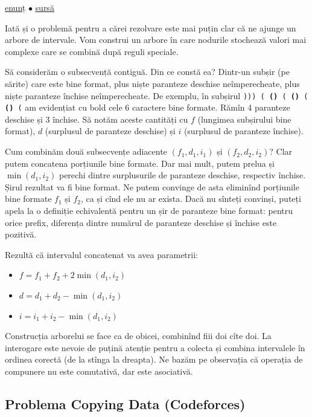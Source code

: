 \documentclass[../main.tex]{subfiles}
\begin{document}
\href{https://codeforces.com/contest/380/problem/C}{enunț}
$\bullet$
\hyperref[code:sereja-and-brackets]{sursă}

Iată și o problemă pentru a cărei rezolvare este mai puțin clar că ne ajunge un arbore de intervale. Vom construi un arbore în care nodurile stochează valori mai complexe care se combină după reguli speciale.

Să considerăm o subsecvență contiguă. Din ce constă ea? Dintr-un subșir (pe sărite) care este bine format, plus niște paranteze deschise neîmperecheate, plus niște paranteze închise neîmperecheate. De exemplu, în subșirul \texttt{))) ( \textbf{()} ( \textbf{()} ( \textbf{()} (} am evidențiat cu bold cele 6 caractere bine formate. Rămîn 4 paranteze deschise și 3 închise. Să notăm aceste cantități cu $f$ (lungimea subșirului bine format), $d$ (surplusul de paranteze deschise) și $i$ (surplusul de paranteze închise).

Cum combinăm două subsecvențe adiacente $(f_1, d_1, i_1)$ și $(f_2, d_2, i_2)$? Clar putem concatena porțiunile bine formate. Dar mai mult, putem prelua și $\min(d_1, i_2)$ perechi dintre surplusurile de paranteze deschise, respectiv închise. Șirul rezultat va fi bine format. Ne putem convinge de asta eliminînd porțiunile bine formate $f_1$ și $f_2$, ca și cînd ele nu ar exista. Dacă nu sînteți convinși, puteți apela la o definiție echivalentă pentru un șir de paranteze bine format: pentru orice prefix, diferența dintre numărul de paranteze deschise și închise este pozitivă.

Rezultă că intervalul concatenat va avea parametrii:


\begin{itemize}
  \item $f = f_1 + f_2 + 2 \min(d_1, i_2)$
  \item $d = d_1 + d_2 - \min(d_1, i_2)$
  \item $i = i_1 + i_2 - \min(d_1, i_2)$
\end{itemize}

Construcția arborelui se face ca de obicei, combinînd fiii doi cîte doi. La interogare este nevoie de puțină atenție pentru a colecta și combina intervalele în ordinea corectă (de la stînga la dreapta). Ne bazăm pe observația că operația de compunere nu este comutativă, dar este asociativă.

\subsection{Problema Copying Data (Codeforces)}
\label{problem:copying-data}
\end{document}
